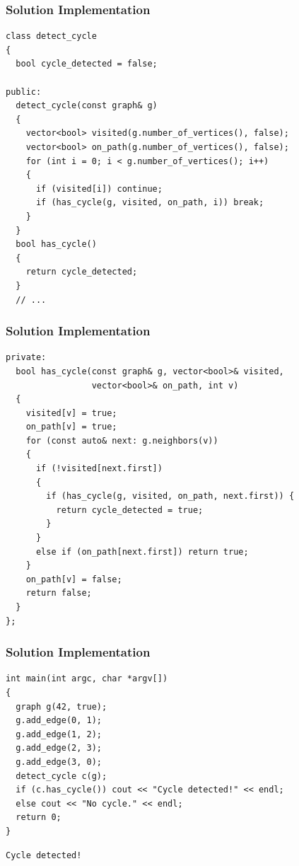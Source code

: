 \documentclass{beamer}
\begin{document}
\begin{frame}[containsverbatim]
\frametitle{Solution Implementation}

\scriptsize
\begin{lstlisting}
class detect_cycle
{
  bool cycle_detected = false;

public:
  detect_cycle(const graph& g)
  {
    vector<bool> visited(g.number_of_vertices(), false);
    vector<bool> on_path(g.number_of_vertices(), false);
    for (int i = 0; i < g.number_of_vertices(); i++)
    {
      if (visited[i]) continue;
      if (has_cycle(g, visited, on_path, i)) break;
    }
  }
  bool has_cycle()
  {
    return cycle_detected;
  }
  // ...
\end{lstlisting}

\end{frame}

\begin{frame}[containsverbatim]
\frametitle{Solution Implementation}

\scriptsize
\begin{lstlisting}
private:
  bool has_cycle(const graph& g, vector<bool>& visited,
                 vector<bool>& on_path, int v)
  {
    visited[v] = true;
    on_path[v] = true;
    for (const auto& next: g.neighbors(v))
    {
      if (!visited[next.first])
      {
        if (has_cycle(g, visited, on_path, next.first)) {
          return cycle_detected = true;
        }
      }
      else if (on_path[next.first]) return true;
    }
    on_path[v] = false;
    return false;
  }
};
\end{lstlisting}

\end{frame}

\begin{frame}[containsverbatim]
\frametitle{Solution Implementation}

\scriptsize
\begin{lstlisting}
int main(int argc, char *argv[])
{
  graph g(42, true);
  g.add_edge(0, 1);
  g.add_edge(1, 2);
  g.add_edge(2, 3);
  g.add_edge(3, 0);
  detect_cycle c(g);
  if (c.has_cycle()) cout << "Cycle detected!" << endl;
  else cout << "No cycle." << endl;
  return 0;
}
\end{lstlisting}

\begin{verbatim}
Cycle detected!
\end{verbatim}

\end{frame}
\end{document}
